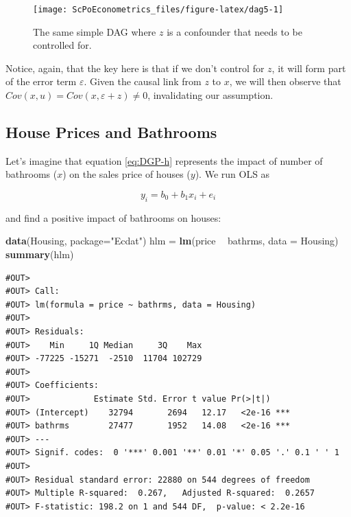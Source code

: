\documentclass[]{book}
\newenvironment{Shaded}{\begin{snugshade}}{\end{snugshade}}
\newcommand{\DataTypeTok}[1]{\textcolor[rgb]{0.13,0.29,0.53}{#1}}
\newcommand{\KeywordTok}[1]{\textcolor[rgb]{0.13,0.29,0.53}{\textbf{#1}}}
\newcommand{\NormalTok}[1]{#1}
\newcommand{\OperatorTok}[1]{\textcolor[rgb]{0.81,0.36,0.00}{\textbf{#1}}}
\newcommand{\StringTok}[1]{\textcolor[rgb]{0.31,0.60,0.02}{#1}}
\begin{document}
\begin{figure}

{\centering \texttt{[image: ScPoEconometrics\_files/figure-latex/dag5-1]} 

}

\caption{The same simple DAG where $z$ is a confounder that needs to be controlled for.}\label{fig:dag5}
\end{figure}

Notice, again, that the key here is that if we don't control for \(z\), it will form part of the error term \(\varepsilon\). Given the causal link from \(z\) to \(x\), we will then observe that \(Cov(x,u) = Cov(x,\varepsilon + z) \neq 0\), invalidating our assumption.

\hypertarget{house-prices-and-bathrooms}{%
\subsection{House Prices and Bathrooms}\label{house-prices-and-bathrooms}}

Let's imagine that equation \eqref{eq:DGP-h} represents the impact of number of bathrooms (\(x\)) on the sales price of houses (\(y\)). We run OLS as

\[
y_i = b_0 + b_1 x_i + e_i 
\]

and find a positive impact of bathrooms on houses:

\begin{Shaded}
\begin{Highlighting}[]
\KeywordTok{data}\NormalTok{(Housing, }\DataTypeTok{package=}\StringTok{"Ecdat"}\NormalTok{)}
\NormalTok{hlm =}\StringTok{ }\KeywordTok{lm}\NormalTok{(price }\OperatorTok{~}\StringTok{ }\NormalTok{bathrms, }\DataTypeTok{data =}\NormalTok{ Housing)}
\KeywordTok{summary}\NormalTok{(hlm)}
\end{Highlighting}
\end{Shaded}

\begin{verbatim}
#OUT> 
#OUT> Call:
#OUT> lm(formula = price ~ bathrms, data = Housing)
#OUT> 
#OUT> Residuals:
#OUT>    Min     1Q Median     3Q    Max 
#OUT> -77225 -15271  -2510  11704 102729 
#OUT> 
#OUT> Coefficients:
#OUT>             Estimate Std. Error t value Pr(>|t|)    
#OUT> (Intercept)    32794       2694   12.17   <2e-16 ***
#OUT> bathrms        27477       1952   14.08   <2e-16 ***
#OUT> ---
#OUT> Signif. codes:  0 '***' 0.001 '**' 0.01 '*' 0.05 '.' 0.1 ' ' 1
#OUT> 
#OUT> Residual standard error: 22880 on 544 degrees of freedom
#OUT> Multiple R-squared:  0.267,	Adjusted R-squared:  0.2657 
#OUT> F-statistic: 198.2 on 1 and 544 DF,  p-value: < 2.2e-16
\end{verbatim}
\end{document}
